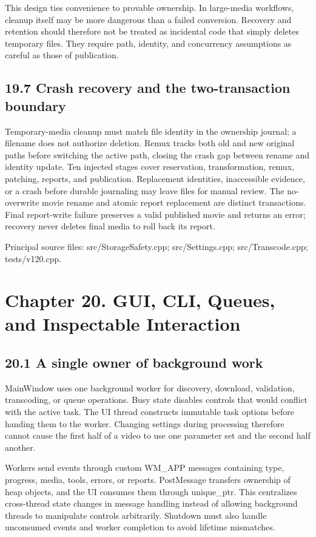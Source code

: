 \documentclass[11pt,a4paper,openany]{book}
\begin{document}
This design ties convenience to provable ownership. In large-media workflows, cleanup itself may be more dangerous than a failed conversion. Recovery and retention should therefore not be treated as incidental code that simply deletes temporary files. They require path, identity, and concurrency assumptions as careful as those of publication.


\section*{19.7 Crash recovery and the two-transaction boundary}
Temporary-media cleanup must match file identity in the ownership journal; a filename does not authorize deletion. Remux tracks both old and new original paths before switching the active path, closing the crash gap between rename and identity update. Ten injected stages cover reservation, transformation, remux, patching, reports, and publication. Replacement identities, inaccessible evidence, or a crash before durable journaling may leave files for manual review. The no-overwrite movie rename and atomic report replacement are distinct transactions. Final report-write failure preserves a valid published movie and returns an error; recovery never deletes final media to roll back its report.


\par\small Principal source files: src/StorageSafety.cpp; src/Settings.cpp; src/Transcode.cpp; tests/v120.cpp.\normalsize

\chapter*{Chapter 20. GUI, CLI, Queues, and Inspectable Interaction}

\section*{20.1 A single owner of background work}
MainWindow uses one background worker for discovery, download, validation, transcoding, or queue operations. Busy state disables controls that would conflict with the active task. The UI thread constructs immutable task options before handing them to the worker. Changing settings during processing therefore cannot cause the first half of a video to use one parameter set and the second half another.

Workers send events through custom WM\_APP messages containing type, progress, media, tools, errors, or reports. PostMessage transfers ownership of heap objects, and the UI consumes them through unique\_ptr. This centralizes cross-thread state changes in message handling instead of allowing background threads to manipulate controls arbitrarily. Shutdown must also handle unconsumed events and worker completion to avoid lifetime mismatches.
\end{document}
